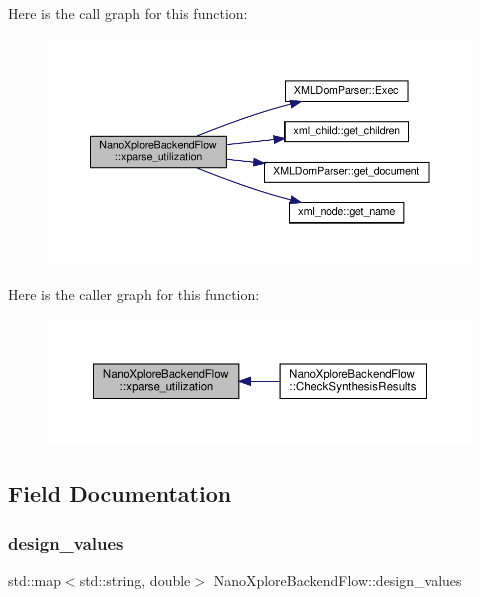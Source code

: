 Here is the call graph for this function\+:
\nopagebreak
\begin{figure}[H]
\begin{center}
\leavevmode
\includegraphics[width=350pt]{d3/d3c/classNanoXploreBackendFlow_ac0920ff76e065f5a1879d7133be5f23f_cgraph}
\end{center}
\end{figure}
Here is the caller graph for this function\+:
\nopagebreak
\begin{figure}[H]
\begin{center}
\leavevmode
\includegraphics[width=350pt]{d3/d3c/classNanoXploreBackendFlow_ac0920ff76e065f5a1879d7133be5f23f_icgraph}
\end{center}
\end{figure}


\subsection{Field Documentation}
\mbox{\label{classNanoXploreBackendFlow_a4c00247cba9ca992f1d601d0a6bd033f}} 
\subsubsection{\texorpdfstring{design\+\_\+values}{design\_values}}
{\footnotesize\ttfamily std\+::map$<$std\+::string, double$>$ Nano\+Xplore\+Backend\+Flow\+::design\+\_\+values\hspace{0.3cm}{\ttfamily [protected]}}



